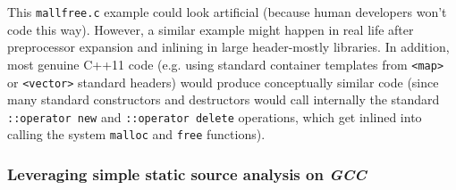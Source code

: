 \medskip

This \texttt{mallfree.c} example could look artificial (because human
developers won't code this way). However, a similar example might
happen in real life after preprocessor expansion and inlining in large
header-mostly libraries. In addition, most genuine C++11  code
(e.g. using standard container  templates from \texttt{<map>} or
\texttt{<vector>} standard headers) would produce conceptually similar
code (since many standard constructors and destructors would call
internally the standard \texttt{::operator new} and \texttt{::operator
  delete} operations, which get inlined into calling the system
\texttt{malloc} and \texttt{free} functions).

\newpage


\subsubsection{Leveraging simple static source analysis on \emph{GCC}}
\label{subsubsec:leveraging-static-analysis}

